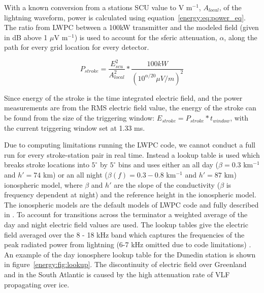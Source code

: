 With a known conversion from a stations SCU value to V m$^{-1}$, $A_{local}$, of the lightning waveform, power is calculated using equation~\ref{energy:eq:power_eq}.
The ratio from LWPC between a 100kW transmitter and the modeled field (given in dB above 1 $\mu$V m$^{-1}$) is used to account for the sferic attenuation, $\alpha$, along the path for every grid location for every detector.

\begin{equation}
P_{stroke}=\frac{E_{scu}^2}{A_{local}^2} * \frac{100kW}{(10^{\alpha/20}\mu V/m)^2}
\label{energy:eq:power_eq}
\end{equation}

Since energy of the stroke is the time integrated electric field, and the power measurements are from the RMS electric field value, the energy of the stroke can be found from the size of the triggering window: $E_{stroke}=P_{stroke} * t_{window}$, with the current triggering window set at 1.33 ms.

Due to computing limitations running the LWPC code, we cannot conduct a full run for every stroke-station pair in real time.
Instead a lookup table is used which breaks stroke locations into $5^{\circ}$ by $5^{\circ}$ bins and uses either an all day ($\beta=0.3$ km$^{-1}$ and $h'=74$ km) or an all night ($\beta(f)=0.3-0.8$ km$^{-1}$ and $h'=87$ km) ionospheric model, where $\beta$ and $h'$ are the slope of the conductivity ($\beta$ is frequency dependent at night) and the reference height in the ionospheric model.
The ionospheric models are the default models of LWPC code and fully described in \citet{Ferguson1998}. 
To account for transitions across the terminator a weighted average of the day and night electric field values are used.
The lookup tables give the electric field averaged over the 8 - 18 kHz band which captures the frequencies of the peak radiated power from lightning (6-7 kHz omitted due to code limitations) \citep{Volland1995}.
An example of the day ionosphere lookup table for the Dunedin station is shown in figure~\ref{energy:fig:lookup}.
The discontinuity of electric field over Greenland and in the South Atlantic is caused by the high attenuation rate of VLF propagating over ice.

